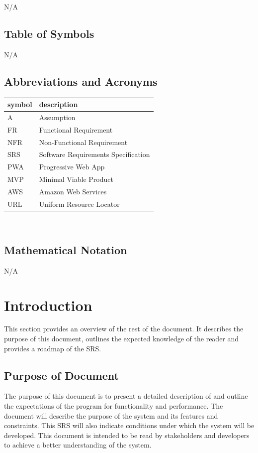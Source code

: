 \documentclass[12pt]{article}
\begin{document}
N/A

\subsection{Table of Symbols}

N/A

\subsection{Abbreviations and Acronyms}

\renewcommand{\arraystretch}{1.2}
\begin{tabular}{l l} 
  \toprule		
  \textbf{symbol} & \textbf{description}\\
  \midrule 
  A & Assumption\\
  FR & Functional Requirement\\
  NFR & Non-Functional Requirement\\
  SRS & Software Requirements Specification\\
  PWA & Progressive Web App\\
  MVP & Minimal Viable Product\\
  AWS & Amazon Web Services\\
  URL & Uniform Resource Locator\\
  \bottomrule
\end{tabular}\\
\subsection{Mathematical Notation}

N/A

\newpage


\section{Introduction}

This section provides an overview of the rest of the document. It describes the purpose of this document, outlines the expected knowledge of the reader and provides a roadmap of the SRS.

\subsection{Purpose of Document}

  The purpose of this document is to present a detailed description of \progname{} and outline the expectations of the program for functionality and performance. The document will describe the purpose of the system and its features and constraints. This SRS will also indicate conditions under which the system will be developed. This document is intended to be read by stakeholders and developers to achieve a better understanding of the system.
\end{document}
